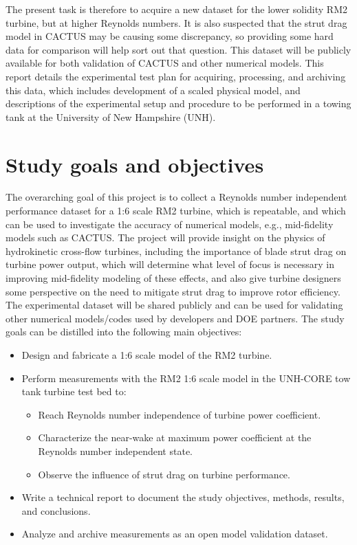 \documentclass[12pt,letterpaper]{scrreprt}
\begin{document}
The present task is therefore to acquire a new dataset for the lower solidity
RM2 turbine, but at higher Reynolds numbers. It is also suspected that the strut
drag model in CACTUS may be causing some discrepancy, so providing some hard
data for comparison will help sort out that question. This dataset will be
publicly available for both validation of CACTUS and other numerical models.
This report details the experimental test plan for acquiring, processing, and
archiving this data, which includes development of a scaled physical model, and
descriptions of the experimental setup and procedure to be performed in a towing
tank at the University of New Hampshire (UNH).


\section{Study goals and objectives}

The overarching goal of this project is to collect a Reynolds number independent
performance dataset for a 1:6 scale RM2 turbine, which is repeatable, and which
can be used to investigate the accuracy of numerical models, e.g., mid-fidelity
models such as CACTUS. The project will provide insight on the physics of
hydrokinetic cross-flow turbines, including the importance of blade strut drag
on turbine power output, which will determine what level of focus is necessary
in improving mid-fidelity modeling of these effects, and also give turbine
designers some perspective on the need to mitigate strut drag to improve rotor
efficiency. The experimental dataset will be shared publicly and can be used for
validating other numerical models/codes used by developers and DOE partners. The
study goals can be distilled into the following main objectives:

\begin{itemize}
	\item Design and fabricate a 1:6 scale model of the RM2 turbine.

	\item Perform measurements with the RM2 1:6 scale model in the UNH-CORE tow tank turbine test bed to:

	\begin{itemize}
		\item Reach Reynolds number independence of turbine power coefficient. 
		
		\item Characterize the near-wake at maximum power coefficient at the Reynolds
		number independent state.
		
		\item Observe the influence of strut drag on turbine performance.
	\end{itemize}

	\item Write a technical report to document the study objectives, methods,
	results, and conclusions.
	
	\item Analyze and archive measurements as an open model validation dataset.
\end{itemize}
\end{document}
